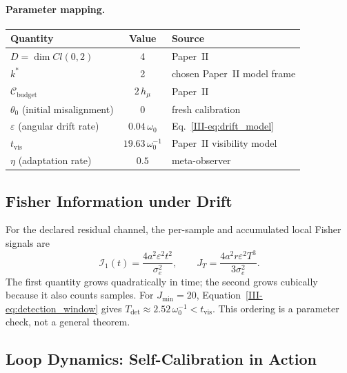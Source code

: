 \documentclass[12pt,a4paper,openany]{book}
\begin{document}
\paragraph{Parameter mapping.}
\begin{center}
\small
\begin{tabular}{@{}lcl@{}}
\toprule
\textbf{Quantity} & \textbf{Value} & \textbf{Source} \\
\midrule
$D = \dim Cl(0,2)$ & 4 & Paper~II \\
$k^*$ & 2 & chosen Paper~II model frame \\
$\mathcal{C}_{\mathrm{budget}}$ & $2\,h_\mu$ & Paper~II \\
$\theta_0$ (initial misalignment) & 0 & fresh calibration \\
$\varepsilon$ (angular drift rate) & $0.04\,\omega_0$
  & Eq.~\eqref{III-eq:drift_model} \\
$t_{\mathrm{vis}}$ & $19.63\,\omega_0^{-1}$
  & Paper~II visibility model \\
$\eta$ (adaptation rate) & $0.5$ & meta-observer \\
\bottomrule
\end{tabular}
\end{center}

\subsection{Fisher Information under Drift}
\label{III-subsec:fisher_drift}

For the declared residual channel, the per-sample and accumulated local
Fisher signals are
\begin{equation}
\label{III-eq:fisher_qubit}
\mathcal I_1(t)=\frac{4a^2\varepsilon^2t^2}{\sigma_e^2},
\qquad
J_T=\frac{4a^2r\varepsilon^2T^3}{3\sigma_e^2}.
\end{equation}
The first quantity grows quadratically in time; the second grows
cubically because it also counts samples.  For $J_{\min}=20$,
Equation~\eqref{III-eq:detection_window} gives
$T_{\mathrm{det}}\approx2.52\,\omega_0^{-1}<t_{\mathrm{vis}}$.
This ordering is a parameter check, not a general theorem.

\subsection{Loop Dynamics: Self-Calibration in Action}
\label{III-subsec:loop_dynamics}
\end{document}
